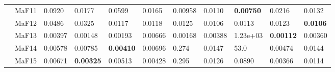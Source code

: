 \documentclass[]{article}
\begin{document}
\begin{landscape}
\begin{table}
\begin{footnotesize}
\begin{tabular}{|l|l|l|l|l|l|l|l|l|l|l|}
 & MaF11 & 0.0920 & 0.0177 & 0.0599 & 0.0165 & \cellcolor{gray95} 0.00958 & \cellcolor{gray95} 0.0110 & \cellcolor{gray95} {\bf 0.00750} & 0.0216 & 0.0132\\
 & MaF12 & 0.0486 & 0.0325 & 0.0117 & 0.0118 & 0.0125 & \cellcolor{gray95} 0.0106 & \cellcolor{gray95} 0.0113 & 0.0123 & \cellcolor{gray95} {\bf 0.0106}\\
 & MaF13 & 0.00397 & \cellcolor{gray95} 0.00148 & 0.00193 & 0.00666 & \cellcolor{gray95} 0.00168 & 0.00388 & \cellcolor{gray95} 1.23e+03 & \cellcolor{gray95} {\bf 0.00112} & 0.00360\\
 & MaF14 & \cellcolor{gray95} 0.00578 & 0.00785 & \cellcolor{gray95} {\bf 0.00410} & 0.00696 & 0.274 & 0.0147 & 53.0 & \cellcolor{gray95} 0.00474 & 0.0144\\
 & MaF15 & 0.00671 & \cellcolor{gray95} {\bf 0.00325} & 0.00513 & \cellcolor{gray95} 0.00428 & 0.295 & 0.0126 & 0.0890 & \cellcolor{gray95} 0.00366 & 0.0114\\
\hline


\end{tabular}
\end{footnotesize}
\end{table}
\end{landscape}
\end{document}
